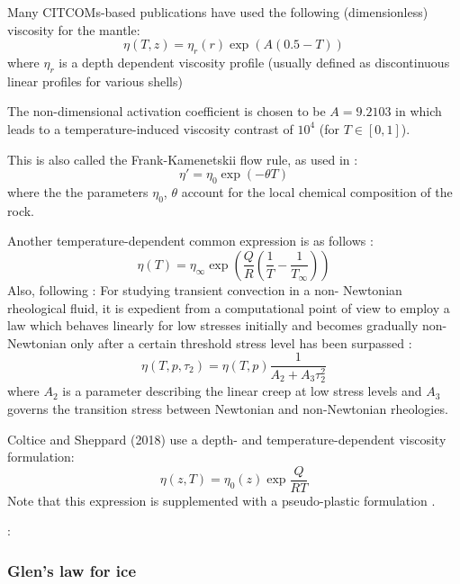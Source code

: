 Many CITCOMs-based publications \cite{bumb10,budt14} 
have used the following (dimensionless) viscosity for the mantle:
\[
\eta(T,z) = \eta_r(r) \exp(A(0.5-T))
\]
where $\eta_r$ is a depth dependent viscosity profile (usually defined as 
discontinuous linear profiles for various shells)

The non-dimensional activation coefficient is chosen to be $A=9.2103$ in 
\cite{budt14} which leads to a temperature-induced viscosity contrast of $10^4$ (for 
$T\in[0,1]$).

This is also called the Frank-Kamenetskii flow rule, as used in \cite{stha13,lemh17}:
\[
\eta' = \eta_0 \exp(-\theta T)
\]
where the the parameters $\eta_0$, $\theta$ account for the local chemical composition of the rock.

Another temperature-dependent common expression is as follows \cite{flyu84}:
\[
\eta(T)=\eta_\infty \exp \left( \frac{Q}{R}(\frac{1}{T}-\frac{1}{T_\infty} ) \right)
\]
Also, following \cite{flyu84}: For studying transient convection in a non-
Newtonian rheological fluid, it is expedient from a
computational point of view to employ a law
which behaves linearly for low stresses initially
and becomes gradually non-Newtonian only after
a certain threshold stress level has been surpassed \cite{chri84,chyu84}:
\[
\eta(T,p,\tau_2) =\eta(T,p) \frac{1}{A_2 + A_3 \tau_2^2}
\]
where $A_2$ is a parameter describing the linear creep
at low stress levels and $A_3$ governs the transition
stress between Newtonian and non-Newtonian rheologies.

Coltice and Sheppard (2018) \cite{cosh18} use a depth- and temperature-dependent 
viscosity formulation:
\[
\eta(z,T)=\eta_0(z) \exp \frac{Q}{RT}
\]
Note that this expression is supplemented with a pseudo-plastic formulation \cite{roct12}.

\Literature: \cite{king16}

\subsubsection{Glen's law for ice}\label{ss:glen}

